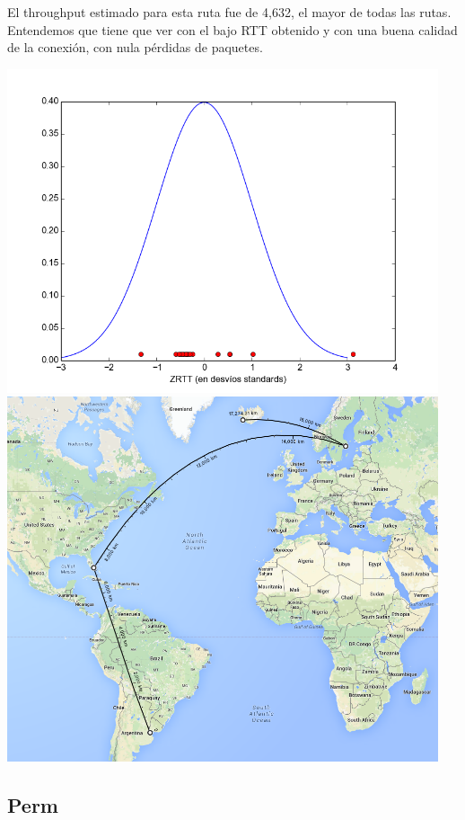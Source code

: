  El throughput estimado para esta ruta fue de 4,632, el mayor de todas las rutas. Entendemos que tiene que ver con el bajo RTT obtenido y con una buena calidad de la conexión, con nula pérdidas de paquetes.

 \includegraphics[width=5in]{imgs/iceland_dist.png}
 \includegraphics[width=5in]{imgs/maps/iceland.png}

\subsection{Perm}

